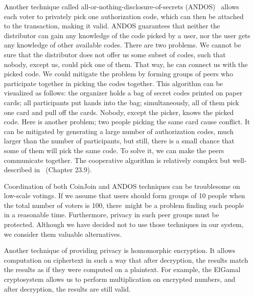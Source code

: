 \documentclass[applsci,article,accept,moreauthors,pdftex]{Definitions/mdpi}
\begin{document}
Another technique called all-or-nothing-disclosure-of-secrets (ANDOS)~\cite{andos,salomaa1990secret,applied_cryptography} allows each voter to privately pick one authorization code, which can then be attached to the transaction, making it valid. ANDOS guarantees that neither the distributor can gain any knowledge of the code picked by a user, nor the user gets any knowledge of other available codes. There are two problems. We cannot be sure that the distributor does not offer us some subset of codes, such that nobody, except us, could pick one of them. That way, he can connect us with the picked code. We could mitigate the problem by forming groups of peers who participate together in picking the codes together. This algorithm can be visualized as follows: the organizer holds a bag of secret codes printed on paper cards; all participants put hands into the bag; simultaneously, all of them pick one card and pull off the cards. Nobody, except the picker, knows the picked code. Here is another problem; two people picking the same card cause conflict. It can be mitigated by generating a large number of authorization codes, much larger than the number of participants, but still, there is a small chance that some of them will pick the same code. To solve it, we can make the peers communicate together. The cooperative algorithm is relatively complex but well-described in~\cite{applied_cryptography} (Chapter 23.9).


Coordination of both CoinJoin and ANDOS techniques can be troublesome on low-scale votings. If we assume that users should form groups of 10 people when the total number of voters is 100, there~might be a problem finding such people in a reasonable time. Furthermore, privacy in such peer groups must be protected. Although we have decided not to use those techniques in our system, we consider them valuable alternatives.

Another technique of providing privacy is homomorphic encryption. It allows computation on ciphertext in such a way that after decryption, the results match the results as if they were computed on a plaintext. For example, the ElGamal cryptosystem allows us to perform multiplication on encrypted numbers, and after decryption, the results are still valid. 
\end{document}
